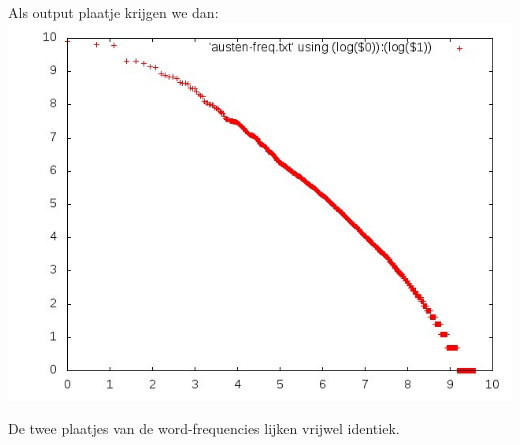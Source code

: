 \documentclass[a4paper,11pt]{article}
\begin{document}
\noindent Als output plaatje krijgen we dan:\\
\includegraphics[scale=0.4]{austen.jpg}

\noindent De twee plaatjes van de word-frequencies lijken vrijwel identiek.
\end{document}
